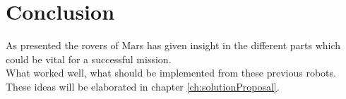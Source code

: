 

\section{Conclusion}
As presented the rovers of Mars has given insight in the different parts which could be vital for a successful mission.\\ 
What worked well, what should be implemented from these previous robots. These ideas will be elaborated in chapter \ref{ch:solutionProposal}.

